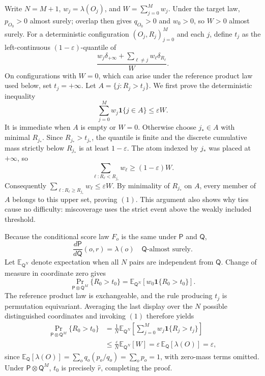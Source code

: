 Write \(N=M+1\), \(w_j=\lambda(O_j)\), and \(W=\sum_{j=0}^{M}w_j\). Under the target law, \(p_{O_0}>0\) almost surely; overlap then gives \(q_{O_0}>0\) and \(w_0>0\), so \(W>0\) almost surely. For a deterministic configuration \((O_j,R_j)_{j=0}^{M}\) and each \(j\), define \(t_j\) as the left-continuous \((1-\varepsilon)\)-quantile of
\[\frac{w_j\delta_{+\infty}+\sum_{\ell\ne j}w_\ell\delta_{R_\ell}}{W}.\]
On configurations with \(W=0\), which can arise under the reference product law used below, set \(t_j=+\infty\). Let \(A=\{j:R_j>t_j\}\). We first prove the deterministic inequality
\[\sum_{j=0}^{M}w_j\mathbf 1\{j\in A\}\le\varepsilon W.\tag{1}\]
It is immediate when \(A\) is empty or \(W=0\). Otherwise choose \(j_*\in A\) with minimal \(R_{j_*}\). Since \(R_{j_*}>t_{j_*}\), the quantile is finite and the discrete cumulative mass strictly below \(R_{j_*}\) is at least \(1-\varepsilon\). The atom indexed by \(j_*\) was placed at \(+\infty\), so
\[\sum_{\ell:R_\ell<R_{j_*}}w_\ell\ge(1-\varepsilon)W.\]
Consequently \(\sum_{\ell:R_\ell\ge R_{j_*}}w_\ell\le\varepsilon W\). By minimality of \(R_{j_*}\) on \(A\), every member of \(A\) belongs to this upper set, proving \((1)\). This argument also shows why ties cause no difficulty: miscoverage uses the strict event above the weakly included threshold.

Because the conditional score law \(F_o\) is the same under \(\mathsf P\) and \(\mathsf Q\),
\[\frac{d\mathsf P}{d\mathsf Q}(o,r)=\lambda(o)\quad\mathsf Q\text{-almost surely}.\]
Let \(\mathbb E_{\mathsf Q^N}\) denote expectation when all \(N\) pairs are independent from \(\mathsf Q\). Change of measure in coordinate zero gives
\[\Pr_{\mathsf P\otimes\mathsf Q^M}\{R_0>t_0\}=\mathbb E_{\mathsf Q^N}\!\left[w_0\mathbf 1\{R_0>t_0\}\right].\]
The reference product law is exchangeable, and the rule producing \(t_j\) is permutation equivariant. Averaging the last display over the \(N\) possible distinguished coordinates and invoking \((1)\) therefore yields
\[\begin{aligned}\Pr_{\mathsf P\otimes\mathsf Q^M}\{R_0>t_0\}&=\frac1N\mathbb E_{\mathsf Q^N}\!\left[\sum_{j=0}^{M}w_j\mathbf 1\{R_j>t_j\}\right]\\&\le\frac{\varepsilon}{N}\mathbb E_{\mathsf Q^N}[W]=\varepsilon\,\mathbb E_{\mathsf Q}[\lambda(O)]=\varepsilon,\end{aligned}\]
since \(\mathbb E_{\mathsf Q}[\lambda(O)]=\sum_o q_o(p_o/q_o)=\sum_o p_o=1\), with zero-mass terms omitted. Under \(\mathsf P\otimes\mathsf Q^M\), \(t_0\) is precisely \(\widehat r\), completing the proof.